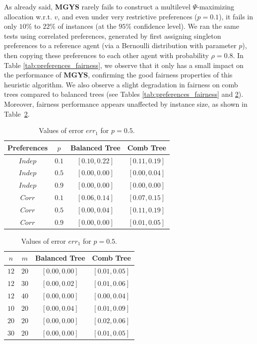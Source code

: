 \documentclass[]{article}
\begin{document}
As already said, \textbf{MGYS} rarely fails to construct a multilevel $\Psi$-maximizing allocation w.r.t. $v$, and even under very restrictive preferences ($p = 0.1$), it fails in only $10\%$ to $22\%$ of instances (at the $95\%$ confidence level). We ran the same tests using correlated preferences, generated by first assigning singleton preferences to a reference agent (via a Bernoulli distribution with parameter $p$), then copying these preferences to each other agent with probability $\rho = 0.8$. In Table \ref{tab:preferences_fairness}, we observe that it only has a small impact on the performance of \textbf{MGYS}, confirming the good fairness properties of this heuristic algorithm. We also observe a slight degradation in fairness on comb trees compared to balanced trees (see Tables \ref{tab:preferences_fairness} and \ref{tab:m_size_fairness}). Moreover, fairness performance appears unaffected by instance size, as shown in Table~\ref{tab:m_size_fairness}.

\begin{table}[h!]
\small
\centering
\begin{minipage}{0.48\textwidth}
  \centering
  \caption{Values of error $err_1$ for $n=15$ and $m=25$.}
  \begin{tabular}{|c|c|c|c|}
    \hline
    Preferences & $p$ & Balanced Tree & Comb Tree \\
    \hline
    $Indep$ & $0.1$ & $[0.10, 0.22]$ & $[0.11, 0.19]$ \\
    $Indep$ & $0.5$ & $[0.00, 0.00]$ & $[0.00, 0.04]$ \\
    $Indep$ & $0.9$ & $[0.00, 0.00]$ & $[0.00, 0.00]$ \\
    \hline
    $Corr$ & $0.1$ & $[0.06, 0.14]$ & $[0.07, 0.15]$ \\
    $Corr$ & $0.5$ & $[0.00, 0.04]$ & $[0.11, 0.19]$ \\
    $Corr$ & $0.9$ & $[0.00, 0.00]$ & $[0.01, 0.05]$ \\
    \hline
  \end{tabular}
  \label{tab:preferences_fairness}
\end{minipage}
\hfill
\begin{minipage}{0.48\textwidth}
  \centering
  \caption{Values of error $err_1$ for $p=0.5$.}
  \begin{tabular}{|c|c|c|c|}
    \hline
    $n$ & $m$ & Balanced Tree & Comb Tree \\
    \hline
    $12$ & $20$ & $[0.00, 0.00]$ & $[0.01, 0.05]$ \\
    $12$ & $30$ & $[0.00, 0.02]$ & $[0.01, 0.06]$ \\
    $12$ & $40$ & $[0.00, 0.00]$ & $[0.00, 0.04]$ \\
    \hline
    $10$ & $20$ & $[0.00, 0.04]$ & $[0.01, 0.09]$ \\
    $20$ & $20$ & $[0.00, 0.00]$ & $[0.02, 0.06]$ \\
    $30$ & $20$ & $[0.00, 0.00]$ & $[0.01, 0.05]$ \\
    \hline
  \end{tabular}
  \label{tab:m_size_fairness}
\end{minipage}
\end{table}
\end{document}
